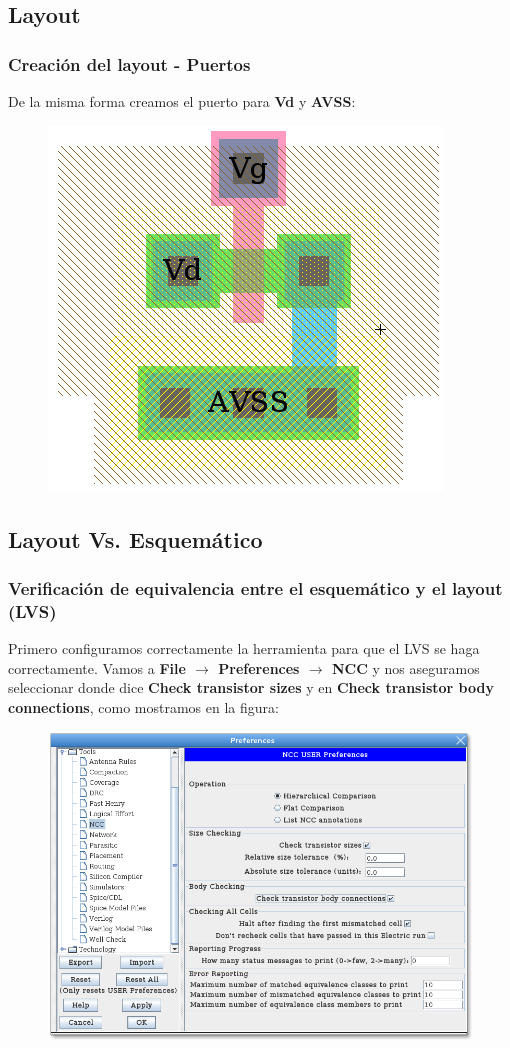\documentclass{beamer}
\begin{document}
\begin{frame}
\subsection{Layout}
\frametitle{Creación del layout - Puertos}
De la misma forma creamos el puerto para \textbf{Vd} y \textbf{AVSS}:
\begin{figure}
  \includegraphics[width=0.51\linewidth]{figuras/edicionElectric-11a.png}
\end{figure}
\end{frame}
\begin{frame}
\subsection{Layout Vs. Esquemático}
\frametitle{Verificación de equivalencia entre el esquemático y el layout (LVS)}
\scriptsize{Primero configuramos correctamente la herramienta para que el LVS se haga correctamente. Vamos a \textbf{File $\rightarrow$ Preferences $\rightarrow$ NCC} y nos aseguramos seleccionar donde dice \textbf{Check transistor sizes} y en \textbf{Check transistor body connections}, como mostramos en la figura:
}
\begin{figure}
  \includegraphics[width=0.75\linewidth]{figuras/edicionElectric-12.png}
\end{figure}
\end{frame}
\end{document}
